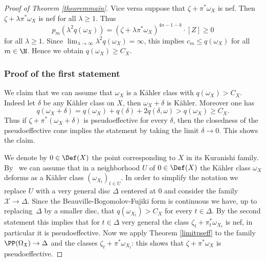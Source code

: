 \begin{proof}[Proof of Theorem \ref{theoremmain}]
Vice versa suppose that $\zeta+\pi^* \omega_X$ is nef. Then $\zeta+ \lambda \pi^* \omega_X$ is nef for all $\lambda \geq 1$.
Thus
\[
p_m(\lambda^2 q(\omega_X)) = (\zeta + \lambda \pi^* \omega_X)^{4n-1-k} \cdot [Z] \geq 0
\]
for all $\lambda \geq 1$. Since $\lim_{\lambda \to \infty} \lambda^2 q(\omega_X) = \infty$, this implies $c_m \leq q(\omega_X)$ for all $m \in \N$. Hence we obtain $q(\omega_X) \geq C_X$.

\subsubsection*{Proof of the first statement}
We claim that we can assume that $\omega_X$ is a Kähler class with $q(\omega_X)>C_X$.
Indeed let $\delta$ be any Kähler class on $X$, then $\omega_X+\delta$ is Kähler. Moreover one has
\[
q(\omega_X+\delta)=q(\omega_X)+q(\delta)+2q(\delta,\omega)>
q(\omega_X) \geq C_X.
\]
Thus if $\zeta+\pi^* (\omega_{X}+\delta)$ is pseudoeffective for every $\delta$, then
the closedness of the pseudoeffective cone implies the statement by
taking the limit $\delta \to 0$. This shows the claim.

We denote by $0\in \Def(X)$ the point corresponding to $X$ in its Kuranishi family. By~\cite[Prop.\,5.6]{Huy16} we can assume that in a neighborhood $U$ of $0\in \Def(X)$ the Kähler class $\omega_X$ deforms as a Kähler class $(\omega_{X_t})_{t \in U}$.
In order to simplify the notation we replace $U$ with a very general disc $\Delta$ centered at $0$ and consider the family $\mathcal{X} \to \Delta$.
Since the Beauville-Bogomolov-Fujiki form is continuous we have, up to replacing~$\Delta$ by a smaller disc, that
$q(\omega_{X_t}) > C_X$ for every $t \in \Delta$.
By the second statement this implies that for $t \in \Delta$ very general the class $\zeta_t + \pi_t^* \omega_{X_t}$ is nef, in particular it is pseudoeffective. Now we apply Theorem \ref{limitpseff} to the family $\PP(\Omega_\mathfrak{X}) \to \Delta$ and the classes $\zeta_{t}+\pi^*\omega_{X_t}$: this shows that $\zeta + \pi^* \omega_{X}$
is pseudoeffective.
\end{proof}

